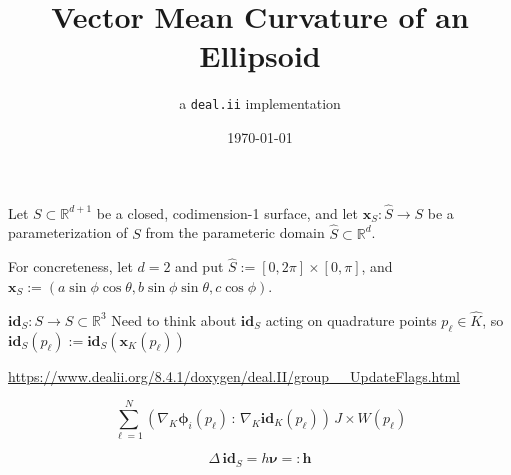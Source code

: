 \documentclass[10pt]{article}
\title{Vector Mean Curvature of an Ellipsoid}
\author{a  \texttt{deal.ii} implementation}
\date{ \today}
\newcommand{\R}{\mathbb{R}}
\newcommand{\mbf}[1]{\mathbf{#1}}
\begin{document}
\maketitle


Let $S \subset \R^{d+1}$ be a closed, codimension-1 surface, and let
$\mathbf{x}_{S}: \hat{S} \to S$ be a parameterization of $S$ from the
parameteric domain $\hat{S} \subset \R^d$.

For concreteness, let $d = 2$ and put $\hat{S} := [0,2\pi] \times [0,\pi]$, and
$\mathbf{x}_{S} := \left( a \sin \phi \cos \theta, b \sin \phi \sin \theta , c
\cos \phi  \right)$.

$\textbf{id}_{S}: S \to S \subset \R^3$ Need to think about $\textbf{id}_{S}$ acting on
quadrature points $p_{\ell} \in \hat{K}$, so $\textbf{id}_{S}(p_{\ell}) :=
\textbf{id}_{S}(\mathbf{x}_{K}(p_{\ell}))$

\url{https://www.dealii.org/8.4.1/doxygen/deal.II/group\_\_UpdateFlags.html}


\begin{equation}
   \sum_{\ell = 1}^{N} \left( \nabla_{K} \boldsymbol{\phi}_{i}(p_{\ell}) \,:\,
   \nabla_{K} \textbf{id}_{K}(p_{\ell}) \right)
   \, J{\times}W(p_{\ell})
   \label{}
\end{equation}


\begin{equation}
   \Delta \,\textbf{id}_{S} = h\boldsymbol{\nu} =: \mbf{h}
   \label{vector_identity}
\end{equation}


\cite{dealII84}






\newpage


\end{document}
